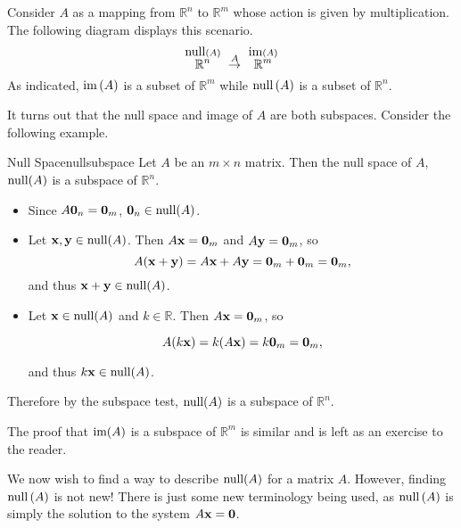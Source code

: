Consider
$A$ as a mapping from $\mathbb{R}^{n}$ to $\mathbb{R}^{m}$ whose action is given by multiplication. The following diagram displays this scenario. 
\begin{equation*}
\overset{\func{null} \left( A\right) }{\mathbb{R}^{n}}\ \overset{A}{\rightarrow }\ 
\overset{
\func{im}\left( A\right) }{\mathbb{R}^{m}}
\end{equation*}
As indicated, $\mbox{im}\left( A\right) $ is a subset of $\mathbb{R}^{m}$
while $\mbox{null} \left( A\right) $ is a subset of $\mathbb{R}^{n}$.

It turns out that the null space and image of $A$ are both subspaces. Consider the following example.

\begin{example}{Null Space}{nullsubspace}
Let $A$ be an $m\times n$ matrix. Then the null space of $A$, $\mbox{null}(A)$ is 
a subspace of $\mathbb{R}^n$.
\end{example}

\begin{solution}
\begin{itemize}
\item Since $A{\bf 0}_n={\bf 0}_m$, 
${\bf 0}_n\in\mbox{null}(A)$.

\item Let ${\bf x},{\bf y}\in\mbox{null}(A)$. 
Then $A{\bf x}={\bf 0}_m$ and $A{\bf y}={\bf 0}_m$, so
\[ A({\bf x}+{\bf y})=A{\bf x}+A{\bf y} = {\bf 0}_m+{\bf 0}_m={\bf 0}_m,\]
and thus ${\bf x}+{\bf y}\in\mbox{null}(A)$.
\item Let ${\bf x}\in\mbox{null}(A)$ and $k\in\mathbb{R}$.
Then $A{\bf x}={\bf 0}_m$, so

\[ A(k{\bf x}) = k(A{\bf x})=k{\bf 0}_m={\bf 0}_m,\]

and thus $k{\bf x}\in\mbox{null}(A)$.
\end{itemize}
Therefore by the subspace test, $\mbox{null}(A)$ is a subspace of $\mathbb{R}^n$.

\end{solution}

The proof that $\mbox{im}(A)$ is a subspace of $\mathbb{R}^m$ is similar and is left as an exercise to the reader. 

We now wish to find a way to describe $\mbox{null}(A)$ for a matrix $A$. However, finding $\mbox{null} \left( A\right)$ is not new! There is just some new
terminology being used, as $\mbox{null} \left( A\right) $ is simply the solution
to the system $A{\bf x}={\bf 0}$.

